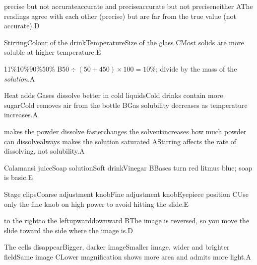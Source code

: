 \begin{gradebody}
{precise but not accurate}{accurate and precise}{accurate but not precise}{neither}
{A}{The readings agree with each other (precise) but are far from the true value (not accurate).}{D}

{Stirring}{Colour of the drink}{Temperature}{Size of the glass}
{C}{Most solids are more soluble at higher temperature.}{E}

{11\%}{10\%}{90\%}{50\%}
{B}{$50 \div (50 + 450) \times 100 = 10\%$; divide by the mass of the \emph{solution}.}{A}

{Heat adds }{Gases dissolve better in cold liquids}{Cold drinks contain more sugar}{Cold removes air from the bottle}
{B}{Gas solubility decreases as temperature increases.}{A}

{makes the powder dissolve faster}{changes the solvent}{increases how much powder can dissolve}{always makes the solution saturated}
{A}{Stirring affects the rate of dissolving, not solubility.}{A}

{Calamansi juice}{Soap solution}{Soft drink}{Vinegar}
{B}{Bases turn red litmus blue; soap is basic.}{E}

{Stage clips}{Coarse adjustment knob}{Fine adjustment knob}{Eyepiece position}
{C}{Use only the fine knob on high power to avoid hitting the slide.}{E}

{to the right}{to the left}{upward}{downward}
{B}{The image is reversed, so you move the slide toward the side where the image is.}{D}

{The cells disappear}{Bigger, darker image}{Smaller image, wider and brighter field}{Same image}
{C}{Lower magnification shows more area and admits more light.}{A}


\end{gradebody}
